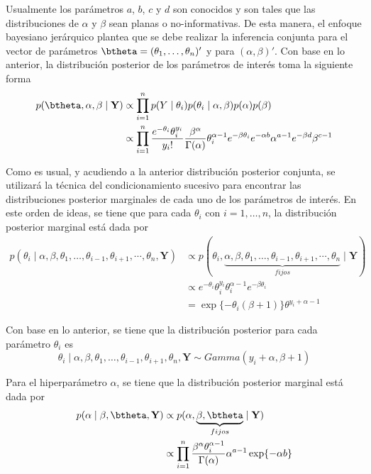 \documentclass[10pt,openright]{book}\usepackage[]{graphicx}\usepackage[]{color}
\begin{document}
Usualmente los par\'ametros $a$, $b$, $c$ y $d$ son conocidos y son tales que las distribuciones de $\alpha$ y $\beta$ sean planas o no-informativas. De esta manera, el enfoque bayesiano jer\'arquico plantea que se debe realizar la inferencia conjunta para el vector de par\'ametros $\btheta=(\theta_1, \ldots, \theta_n)'$ y para $(\alpha, \beta)'$. Con base en lo anterior, la distribuci\'on posterior de los par\'ametros de inter\'es toma la siguiente forma
\begin{align*}
p(\btheta,\alpha,\beta \mid \mathbf{Y})&\propto
\prod_{i=1}^n p(Y\mid \theta_i)p(\theta_i\mid \alpha, \beta)p(\alpha)p(\beta)\\
&\propto \prod_{i=1}^n \frac{e^{-\theta_i}\theta_i^{y_i}}{y_i!}
\frac{\beta^\alpha}{\Gamma(\alpha)}\theta_i^{\alpha-1}e^{-\beta\theta_i}
e^{-\alpha b}\alpha^{a-1}e^{-\beta d}\beta^{c-1}
\end{align*}

Como es usual, y acudiendo a la anterior distribuci\'on posterior conjunta, se utilizar\'a la t\'ecnica del condicionamiento sucesivo para encontrar las distribuciones posterior marginales de cada uno de los par\'ametros de inter\'es. En este orden de ideas, se tiene que para cada $\theta_i$ con $i=1,\ldots,n$, la distribuci\'on posterior marginal est\'a dada por
\begin{align*}
p(\theta_i \mid \alpha,\beta,\theta_1,\ldots,\theta_{i-1},\theta_{i+1},\cdots,\theta_n,\mathbf{Y})
&\propto
p(\theta_i, \underbrace{\alpha,\beta,\theta_1,\ldots,\theta_{i-1},\theta_{i+1},\cdots,\theta_n}_{fijos}\mid\mathbf{Y})\\
&\propto e^{-\theta_i}\theta_i^{y_i}\theta_i^{\alpha-1}e^{-\beta\theta_i}\\
&= \exp\{-\theta_i(\beta+1)\}\theta^{y_i+\alpha-1}
\end{align*}

Con base en lo anterior, se tiene que la distribuci\'on posterior para cada par\'ametro $\theta_i$ es
\begin{equation*}
\theta_i\mid \alpha,\beta,\theta_1,\ldots,\theta_{i-1},\theta_{i+1},\theta_n,\mathbf{Y}
\sim Gamma(y_i+\alpha, \beta+1)
\end{equation*}

Para el hiperpar\'ametro $\alpha$, se tiene que la distribuci\'on posterior marginal est\'a dada por
\begin{align*}
p(\alpha\mid \beta, \btheta, \mathbf{Y})
&\propto p(\alpha, \underbrace{\beta,\btheta}_{fijos}\mid\mathbf{Y})\\
&\propto \prod_{i=1}^n \frac{\beta^\alpha\theta_i^{\alpha-1}}{\Gamma(\alpha)}\alpha^{a-1}\exp\{-\alpha b\}
\end{align*}
\end{document}
